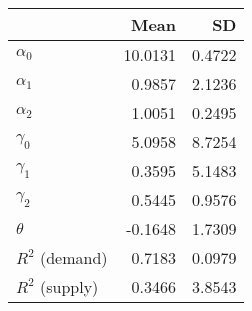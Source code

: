 
\begin{tabular}[t]{lrr}
\toprule
  & Mean & SD\\
\midrule
$\alpha_{0}$ & 10.0131 & 0.4722\\
$\alpha_{1}$ & 0.9857 & 2.1236\\
$\alpha_{2}$ & 1.0051 & 0.2495\\
$\gamma_{0}$ & 5.0958 & 8.7254\\
$\gamma_{1}$ & 0.3595 & 5.1483\\
$\gamma_{2}$ & 0.5445 & 0.9576\\
$\theta$ & -0.1648 & 1.7309\\
$R^{2}$ (demand) & 0.7183 & 0.0979\\
$R^{2}$ (supply) & 0.3466 & 3.8543\\
\bottomrule
\end{tabular}
